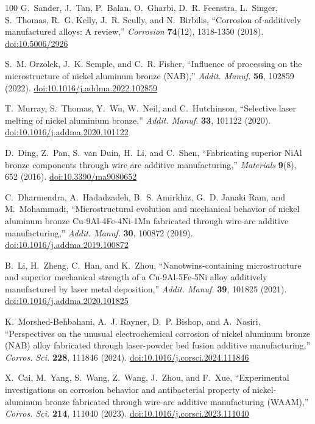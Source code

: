 \documentclass[12pt,letterpaper]{article}
\begin{document}
\begin{thebibliography}{100}
G.~Sander, J.~Tan, P.~Balan, O.~Gharbi, D.~R. Feenstra, L.~Singer,
S.~Thomas, R.~G. Kelly, J.~R. Scully, and N.~Birbilis, ``Corrosion of
additively manufactured alloys: A review,'' \emph{Corrosion} \textbf{74}(12),
1318-1350 (2018).
\href{https://doi.org/10.5006/2926}{doi:10.5006/2926}

S.~M. Orzolek, J.~K. Semple, and C.~R. Fisher, ``Influence of processing on the microstructure of nickel aluminum bronze (NAB),'' \emph{Addit. Manuf.} \textbf{56}, 102859 (2022).
\href{https://doi.org/10.1016/j.addma.2022.102859}{doi:10.1016/j.addma.2022.102859}

T.~Murray, S.~Thomas, Y.~Wu, W.~Neil, and C.~Hutchinson, ``Selective laser melting of nickel aluminium bronze,'' \emph{Addit. Manuf.} \textbf{33}, 101122 (2020).
\href{https://doi.org/10.1016/j.addma.2020.101122}{doi:10.1016/j.addma.2020.101122}

D.~Ding, Z.~Pan, S.~van Duin, H.~Li, and C.~Shen, ``Fabricating superior NiAl bronze components through wire arc additive manufacturing,'' \emph{Materials} \textbf{9}(8), 652 (2016).
\href{https://doi.org/10.3390/ma9080652}{doi:10.3390/ma9080652}

C.~Dharmendra, A.~Hadadzadeh, B.~S. Amirkhiz, G.~D. Janaki Ram, and M.~Mohammadi, ``Microstructural evolution and mechanical behavior of nickel aluminum bronze Cu-9Al-4Fe-4Ni-1Mn fabricated through wire-arc additive manufacturing,'' \emph{Addit. Manuf.} \textbf{30}, 100872 (2019).
\href{https://doi.org/10.1016/j.addma.2019.100872}{doi:10.1016/j.addma.2019.100872}

B.~Li, H.~Zheng, C.~Han, and K.~Zhou, ``Nanotwins-containing microstructure and superior mechanical strength of a Cu-9Al-5Fe-5Ni alloy additively manufactured by laser metal deposition,'' \emph{Addit. Manuf.} \textbf{39}, 101825 (2021).
\href{https://doi.org/10.1016/j.addma.2020.101825}{doi:10.1016/j.addma.2020.101825}

K.~Morshed-Behbahani, A.~J. Rayner, D.~P. Bishop, and A.~Nasiri, ``Perspectives on the unusual electrochemical corrosion of nickel aluminum bronze (NAB) alloy fabricated through laser-powder bed fusion additive manufacturing,'' \emph{Corros. Sci.} \textbf{228}, 111846 (2024).
\href{https://doi.org/10.1016/j.corsci.2024.111846}{doi:10.1016/j.corsci.2024.111846}

X.~Cai, M.~Yang, S.~Wang, Z.~Wang, J.~Zhou, and F.~Xue, ``Experimental investigations on corrosion behavior and antibacterial property of nickel-aluminum bronze fabricated through wire-arc additive manufacturing (WAAM),'' \emph{Corros. Sci.} \textbf{214}, 111040 (2023).
\href{https://doi.org/10.1016/j.corsci.2023.111040}{doi:10.1016/j.corsci.2023.111040}


\end{thebibliography}
\end{document}
